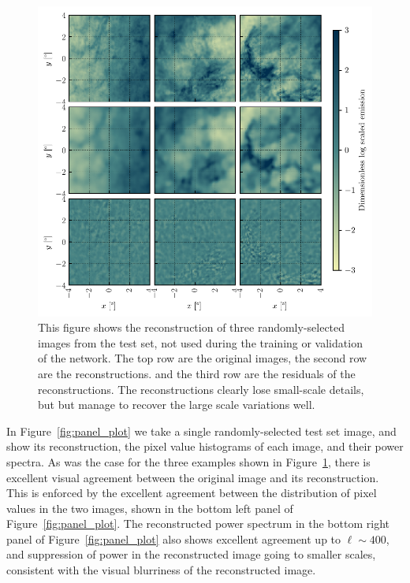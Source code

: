 \documentclass[fleqn,usenatbib]{mnras}
\begin{document}
\begin{figure}
    \centering
    \includegraphics{reconstruciton_w_res.pdf}
    \caption{This figure shows the reconstruction of three randomly-selected images from the test set, not used during the training or validation of the network. The top row are the original images, the second row are the reconstructions. and the third row are the residuals of the reconstructions. The reconstructions clearly lose small-scale details, but but manage to recover the large scale variations well.}
    \label{fig:recon_w_res}
\end{figure}

In Figure~\ref{fig:panel_plot} we take a single randomly-selected test set image, and show its reconstruction, the pixel value histograms of each image, and their power spectra. As was the case for the three examples shown in Figure~\ref{fig:recon_w_res}, there is excellent visual agreement between the original image and its reconstruction. This is enforced by the excellent agreement between the distribution of pixel values in the two images, shown in the bottom left panel of Figure~\ref{fig:panel_plot}. The reconstructed power spectrum in the bottom right panel of Figure~\ref{fig:panel_plot} also shows excellent agreement up to $\ell \sim 400$, and suppression of power in the reconstructed image going to smaller scales, consistent with the visual blurriness of the reconstructed image.
\end{document}
